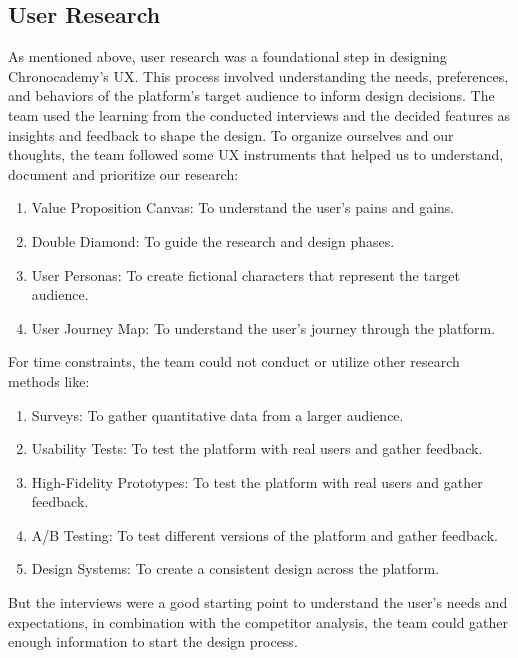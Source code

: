 \subsection{User Research}\label{subsec:user-research}
As mentioned above, user research was a foundational step in designing Chronocademy's UX\@.
This process involved understanding the needs, preferences, and behaviors of the platform's target audience to inform design decisions.
The team used the learning from the conducted interviews and the decided features as insights and feedback to shape the design.
To organize ourselves and our thoughts, the team followed some UX instruments that helped us to understand, document and prioritize our research:\newline
\begin{enumerate}
    \item Value Proposition Canvas: To understand the user's pains and gains.
    \item Double Diamond: To guide the research and design phases.
    \item User Personas: To create fictional characters that represent the target audience.
    \item User Journey Map: To understand the user's journey through the platform.
\end{enumerate}

For time constraints, the team could not conduct or utilize other research methods like:\newline
\begin{enumerate}
    \item Surveys: To gather quantitative data from a larger audience.
    \item Usability Tests: To test the platform with real users and gather feedback.
    \item High-Fidelity Prototypes: To test the platform with real users and gather feedback.
    \item A/B Testing: To test different versions of the platform and gather feedback.
    \item Design Systems: To create a consistent design across the platform.
\end{enumerate}

But the interviews were a good starting point to understand the user's needs and expectations, in combination with the competitor analysis, the team could gather enough information to start the design process.

